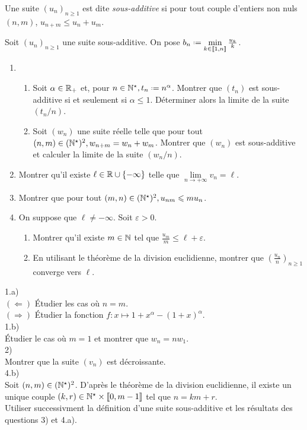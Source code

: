 \begin{defi}
    Une suite $(u_n)_{n\geqslant1}$ est dite \emph{sous-additive} si pour tout couple d'entiers non nuls $(n, m)$, $u_{n+m} \leqslant u_n + u_m$.
\end{defi}

\begin{exercice}
    Soit $(u_n)_{n \geqslant 1}$ une suite sous-additive. On pose $b_n \defeq \min\limits_{k \in \llbracket 1, n \rrbracket} \frac{u_k}{k}$.
    \begin{enumerate}
        \item \begin{enumerate}
            \item Soit $\alpha \in \mathbb{R}_+$ et, pour $n \in \Ne, t_n \defeq n^{\alpha}$. Montrer que $(t_n)$ est sous-additive si et seulement si $\alpha \leqslant 1$. Déterminer alors la limite de la suite $(t_n/n)$.
            \item Soit $(w_n)$ une suite réelle telle que pour tout $(n,m) \in (\mathbb{N}^\star)^2, w_{n+m} = w_n + w_m$. Montrer que $(w_n)$ est sous-additive et calculer la limite de la suite $(w_n / n)$.
        \end{enumerate}
        \item Montrer qu'il existe $\ell \in \mathbb{R} \cup \{ - \infty \}$ telle que $\lim\limits_{n \to +\infty} v_n = \ell$.
        \item Montrer que pour tout $(m,n) \in (\mathbb{N}^\star)^2, u_{nm} \leqslant m u_n$.
        \item On suppose que $\ell \not= - \infty$. Soit $\varepsilon > 0$.
        \begin{enumerate}
            \item Montrer qu'il existe $m \in \mathbb{N}$ tel que $\frac{u_m}{m} \leqslant \ell + \varepsilon$. 
            \item En utilisant le théorème de la division euclidienne, montrer que $\left( \frac{u_n}{n} \right)_{n \geqslant 1}$ converge vers $\ell$.
        \end{enumerate}
    \end{enumerate}
\end{exercice}

\begin{solution}
    1.a)\\ 
    \indent $(\Leftarrow)$ Étudier les cas où $n=m$.\\
    \indent $(\Rightarrow)$ Étudier la fonction $f:x \mapsto 1+x^{\alpha} - (1+x)^{\alpha}$.\\
    1.b)\\
    \indent Étudier le cas où $m=1$ et montrer que $w_n = n w_1$.\\
    2)\\
    \indent Montrer que la suite $(v_n)$ est décroissante.\\ 
    4.b)\\
    \indent Soit $(n, m) \in (\mathbb{N}^\star)^2$. D'après le théorème de la division euclidienne, il existe un unique couple $(k, r) \in \mathbb{N}^\star \times \llbracket0, m-1 \rrbracket$ tel que $n=km+r$.\\
    \indent Utiliser successivment la définition d'une suite sous-additive et les résultats des questions 3) et 4.a).
\end{solution}
